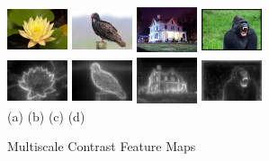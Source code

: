 \documentclass[10pt,twocolumn,letterpaper]{article}
\newcommand{\hs}{\hspace{0.58in}}
\begin{document}
\begin{figure}[t]
    \begin{center}
    \includegraphics[width=0.7in,height=0.54in]{./Figures/contrast/1orig.jpg}
    \includegraphics[width=0.7in,height=0.54in]{./Figures/contrast/2orig.jpg}
    \includegraphics[width=0.7in,height=0.54in]{./Figures/contrast/3orig.jpg}
    \includegraphics[width=0.7in,height=0.54in]{./Figures/contrast/4orig.jpg}\\
    \includegraphics[width=0.7in,height=0.54in]{./Figures/contrast/1cont.jpg}
    \includegraphics[width=0.7in,height=0.54in]{./Figures/contrast/2cont.jpg}
    \includegraphics[width=0.7in,height=0.54in]{./Figures/contrast/3cont.jpg}
    \includegraphics[width=0.7in,height=0.54in]{./Figures/contrast/4cont.jpg}\\
    \footnotesize \hspace{0.1cm} (a) \hs (b) \hs  (c) \hs (d) \\
\caption{Multiscale Contrast Feature Maps} \label{Fig:LocalFeatureMap}
    \end{center}
\end{figure}
\end{document}
